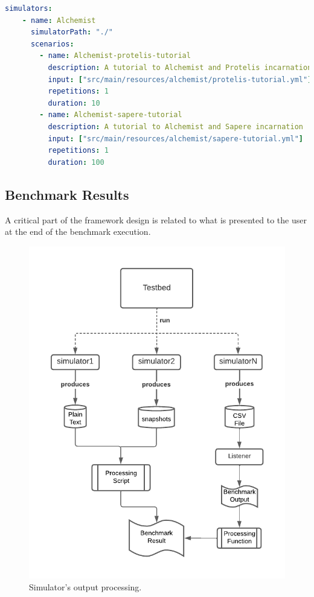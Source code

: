 \documentclass[12pt,a4paper,openright,twoside]{book}
\begin{document}
\begin{lstlisting}[language=yaml, label={lst:benchmark-configuration-sim2}, caption={Benchmark configuration file structure: Alchemist simulator section.}]
  simulators:
    - name: Alchemist
      simulatorPath: "./"
      scenarios:
        - name: Alchemist-protelis-tutorial
          description: A tutorial to Alchemist and Protelis incarnation
          input: ["src/main/resources/alchemist/protelis-tutorial.yml"]
          repetitions: 1
          duration: 10
        - name: Alchemist-sapere-tutorial
          description: A tutorial to Alchemist and Sapere incarnation
          input: ["src/main/resources/alchemist/sapere-tutorial.yml"]
          repetitions: 1
          duration: 100
  \end{lstlisting}

\subsection{Benchmark Results}

A critical part of the framework design is related to what is presented to the user at the end of the benchmark execution.

\begin{figure}[h!]
  \centering
  \includegraphics[width=\textwidth]{figures/output-processing.pdf}
  \caption{Simulator's output processing.}
  \label{fig:output}
\end{figure}
\end{document}
